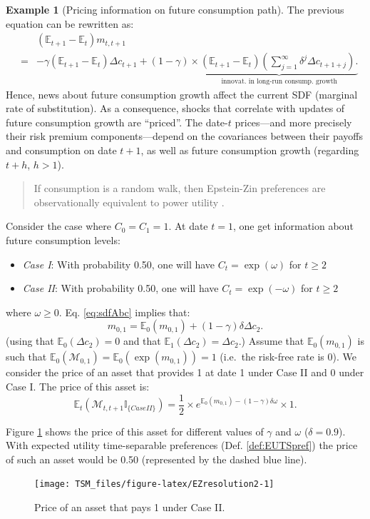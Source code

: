 \documentclass[
  12pt,
]{book}
\providecommand{\tightlist}{%
  \setlength{\itemsep}{0pt}\setlength{\parskip}{0pt}}
\theoremstyle{definition}
\theoremstyle{definition}
\newtheorem{example}{Example}[chapter]
\theoremstyle{definition}
\theoremstyle{definition}
\theoremstyle{remark}
\begin{document}
\begin{example}[Pricing information on future consumption path]
The previous equation can be rewritten as:
\begin{eqnarray}
&& (\mathbb{E}_{t+1} - \mathbb{E}_t) m_{t,t+1} \nonumber \\
&=& - \gamma(\mathbb{E}_{t+1} - \mathbb{E}_t)\Delta c_{t+1} +    (1 - \gamma) \times \underbrace{ (\mathbb{E}_{t+1} - \mathbb{E}_t) \left(  \sum_{j=1}^{\infty}  \delta^j \Delta c_{t+1+j}  \right).}_{\mbox{innovat. in long-run consump. growth}}\label{eq:sdfAbc}
\end{eqnarray}
Hence, news about future consumption growth affect the current SDF (marginal rate of substitution). As a consequence, shocks that correlate with updates of future consumption growth are ``priced''. The date-\(t\) prices---and more precisely their risk premium components---depend on the covariances between their payoffs and consumption on date \(t+1\), as well as future consumption growth (regarding \(t+h\), \(h>1\)).

\begin{quote}
If consumption is a random walk, then Epstein-Zin preferences are observationally equivalent to power utility \citep{Kocherlakota_1990}.
\end{quote}

Consider the case where \(C_0 = C_1 = 1\).
At date \(t=1\), one get information about future consumption levels:

\begin{itemize}
\tightlist
\item
  \emph{Case I}: With probability 0.50, one will have \(C_t=\exp(\omega)\) for \(t\ge2\)
\item
  \emph{Case II}: With probability 0.50, one will have \(C_t=\exp(-\omega)\) for \(t\ge2\)
\end{itemize}

where \(\omega \ge 0\).
Eq. \eqref{eq:sdfAbc} implies that:
\[
m_{0,1} = \mathbb{E}_0(m_{0,1}) + (1 - \gamma)\delta \Delta c_{2}.
\]
(using that \(\mathbb{E}_0(\Delta c_{2})=0\) and that \(\mathbb{E}_1(\Delta c_{2})=\Delta c_{2}\).)
Assume that \(\mathbb{E}_0(m_{0,1})\) is such that \(\mathbb{E}_0(\mathcal{M}_{0,1})=\mathbb{E}_0(\exp(m_{0,1}))=1\) (i.e.~the risk-free rate is 0).
We consider the price of an asset that provides 1 at date 1 under Case II and 0 under Case I.
The price of this asset is:
\[
\mathbb{E}_t(\mathcal{M}_{t,t+1}\mathbb{I}_{\{Case II\}}) = \frac{1}{2} \times e^{\mathbb{E}_0(m_{0,1}) - (1 - \gamma)\delta \omega} \times 1.
\]

Figure \ref{fig:EZresolution2} shows the price of this asset for different values of \(\gamma\) and \(\omega\) (\(\delta=0.9\)). With expected utility time-separable preferences (Def. \ref{def:EUTSpref}) the price of such an asset would be 0.50 (represented by the dashed blue line).

\begin{figure}
\texttt{[image: TSM\_files/figure-latex/EZresolution2-1]} \caption{Price of an asset that pays 1 under Case II.}\label{fig:EZresolution2}
\end{figure}

\end{example}
\end{document}
